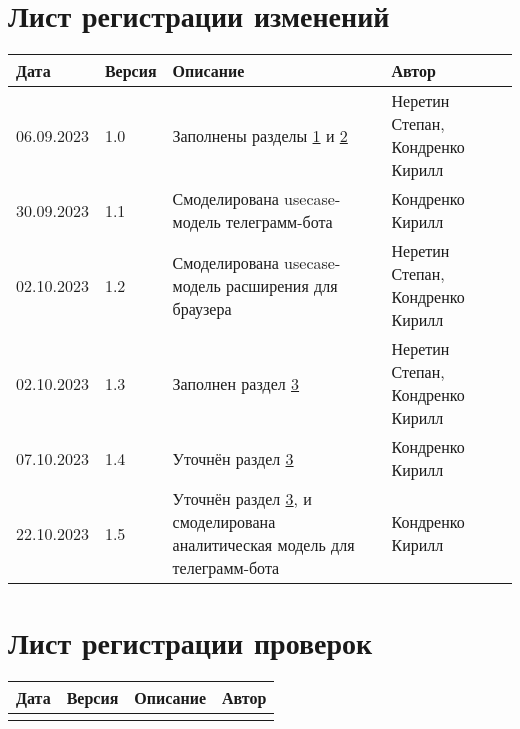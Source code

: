 \chapter*{Лист регистрации изменений}
	\begin{tabularx}{\textwidth}{
			| >{\centering\arraybackslash\hsize=2cm}X
			| >{\centering\arraybackslash\hsize=1.5cm}X
			| >{\centering\arraybackslash}X
			| >{\centering\arraybackslash\hsize=5cm}X
			|}
		\hline
		\textbf{Дата} & \textbf{Версия} & \textbf{Описание} & \textbf{Автор} \\\hline
		
		06.09.2023 & 1.0 & Заполнены разделы \hyperref[chapter1]{1} и \hyperref[chapter2]{2} & Неретин Степан, Кондренко Кирилл \\\hline
		
		30.09.2023 & 1.1 & Смоделирована usecase-модель телеграмм-бота & Кондренко Кирилл \\\hline
		
		02.10.2023 & 1.2 & Смоделирована usecase-модель расширения для браузера & Неретин Степан, Кондренко Кирилл \\\hline
		
		02.10.2023 & 1.3 & Заполнен раздел \hyperref[chapter3]{3} & Неретин Степан, Кондренко Кирилл \\\hline
		

		07.10.2023 & 1.4 & Уточнён раздел \hyperref[chapter3]{3} & Кондренко Кирилл \\\hline

		22.10.2023 & 1.5 & Уточнён раздел \hyperref[chapter3]{3}, и смоделирована аналитическая модель для телеграмм-бота & Кондренко Кирилл \\\hline
	\end{tabularx}
\chapter*{Лист регистрации проверок}
	\begin{tabularx}{\textwidth}{
			| >{\centering\arraybackslash\hsize=2cm}X
			| >{\centering\arraybackslash\hsize=1.5cm}X
			| >{\centering\arraybackslash}X
			| >{\centering\arraybackslash\hsize=5cm}X
			|}
		\hline
		\textbf{Дата} & \textbf{Версия} & \textbf{Описание} & \textbf{Автор} \\
		\hline
		&&& \\
		\hline
	\end{tabularx}
